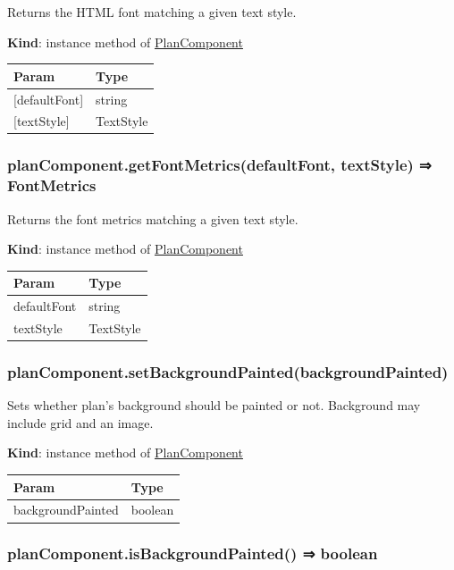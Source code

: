 \documentclass[a4paper]{report}
\begin{document}
Returns the HTML font matching a given text style.

\textbf{Kind}: instance method of
\protect\hyperlink{PlanComponent}{PlanComponent}

\begin{longtable}[]{@{}ll@{}}
\toprule
Param & Type\tabularnewline
\midrule
\endhead
{[}defaultFont{]} & string\tabularnewline
{[}textStyle{]} & TextStyle\tabularnewline
\bottomrule
\end{longtable}

\hypertarget{plancomponent.getfontmetricsdefaultfont-textstyle-fontmetrics}{%
\subsubsection{planComponent.getFontMetrics(defaultFont, textStyle) ⇒
FontMetrics}\label{plancomponent.getfontmetricsdefaultfont-textstyle-fontmetrics}}

Returns the font metrics matching a given text style.

\textbf{Kind}: instance method of
\protect\hyperlink{PlanComponent}{PlanComponent}

\begin{longtable}[]{@{}ll@{}}
\toprule
Param & Type\tabularnewline
\midrule
\endhead
defaultFont & string\tabularnewline
textStyle & TextStyle\tabularnewline
\bottomrule
\end{longtable}

\hypertarget{plancomponent.setbackgroundpaintedbackgroundpainted}{%
\subsubsection{planComponent.setBackgroundPainted(backgroundPainted)}\label{plancomponent.setbackgroundpaintedbackgroundpainted}}

Sets whether plan's background should be painted or not. Background may
include grid and an image.

\textbf{Kind}: instance method of
\protect\hyperlink{PlanComponent}{PlanComponent}

\begin{longtable}[]{@{}ll@{}}
\toprule
Param & Type\tabularnewline
\midrule
\endhead
backgroundPainted & boolean\tabularnewline
\bottomrule
\end{longtable}

\hypertarget{plancomponent.isbackgroundpainted-boolean}{%
\subsubsection{planComponent.isBackgroundPainted() ⇒
boolean}\label{plancomponent.isbackgroundpainted-boolean}}
\end{document}
